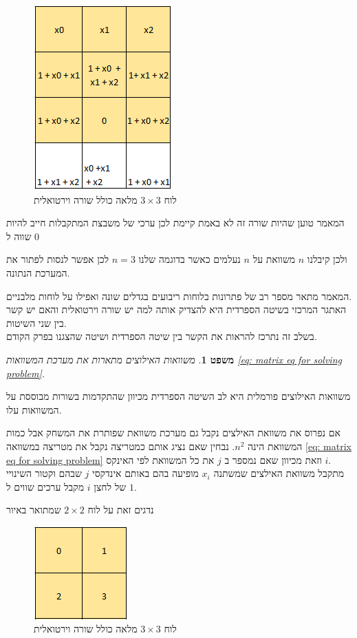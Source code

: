 \documentclass[12pt,twoside]{article}
\newtheorem{theorem}{משפט}[section]
\begin{document}
\begin{figure}[ht]
    \caption{לוח 
    $3 \times 3$
    מלאה
    כולל שורה וירטואלית
    }
    \label{fig: 3 x 3 board fill with virtual}
    \unsethebrew
    \centering
    \includegraphics[width=.3\textwidth,height=.3\textheight,keepaspectratio]{images/3x3_fill_virtual.PNG}
\end{figure}
\sethebrew

המאמר טוען שהיות שורה זה לא באמת קיימת לכן
ערכי 
של משבצת המתקבלות 
חייב להיות שווה 
ל
$0$

ולכן קיבלנו 
$n$
משוואת על 
$n$
נעלמים 
כאשר בדוגמה שלנו 
$n=3$
לכן אפשר לנסות לפתור את המערכת הנתונה.

המאמר 
\cite{B1}
מתאר מספר רב של פתרונות  בלוחות ריבועים בגדלים שונה ואפילו על לוחות מלבניים.
\\
האתגר המרכזי בשיטה הספרדית היא להצדיק אותה למה יש שורה וירטואלית
והאם יש קשר בין שני השיטות.
\\
בשלב זה נתרכז להראות את הקשר בין שיטה הספרדית ושיטה שהצגנו בפרק הקודם.

\begin{theorem}
    משוואות האילוצים מתארות את מערכת המשוואות 
    \ref{eq: matrix eq for solving problem}.
\end{theorem}
משוואות האילוצים פורמלית היא לב השיטה הספרדית
מכיוון שהתקדמות בשורות מבוססת על המשוואות עלו.

אם נפרוס את משוואת האילצים נקבל גם מערכת משוואת שפותרת את המשחק
אבל כמות המשוואת הינה 
$n^2$.
נבחין שאם נציג אותם כמטריצה נקבל את מטריצה במשוואה 
\ref{eq: matrix eq for solving problem}
וזאת מכיוון 
שאם נמספר ב
$j$
את כל המשוואת לפי 
האינקס
$i$.
\\
מתקבל משוואת האילצים שמשתנה 
$x_i$
מופיעה בהם
באותם אינדקסי 
$j$
שבהם 
וקטור השינויי של לחצן
$i$
מקבל ערכים 
שווים
ל
$1$.


נדגים זאת על לוח 
$2 \times 2$
שמתואר באיור 

\begin{figure}[ht]
    \caption{לוח 
    $3 \times 3$
    מלאה
    כולל שורה וירטואלית
    }
    \label{fig: 2 x 2 board}
    \unsethebrew
    \centering
    \includegraphics[width=.3\textwidth,height=.3\textheight,keepaspectratio]{images/2x2_board.PNG}
\end{figure}
\sethebrew
\end{document}
